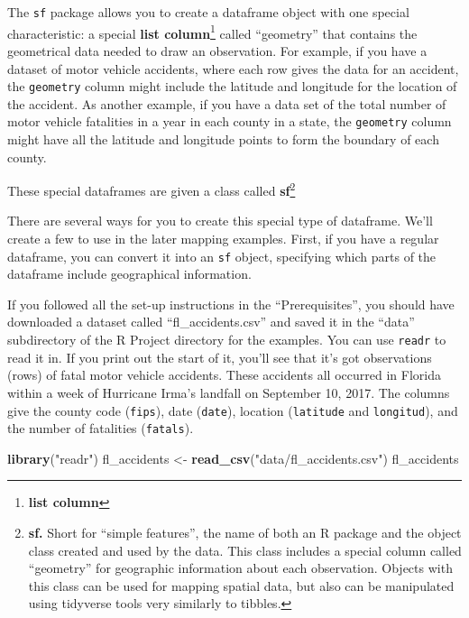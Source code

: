 \documentclass[]{tufte-book}
\newenvironment{Shaded}{}{}
\newcommand{\KeywordTok}[1]{\textcolor[rgb]{0.00,0.44,0.13}{\textbf{#1}}}
\newcommand{\NormalTok}[1]{#1}
\newcommand{\StringTok}[1]{\textcolor[rgb]{0.25,0.44,0.63}{#1}}
\begin{document}
The \texttt{sf} package allows you to create a dataframe object with one special characteristic: a
special \textbf{list column}\footnote{\textbf{list column}}
called ``geometry'' that contains the geometrical data needed to draw
an observation. For example, if you have a dataset of motor vehicle accidents, where each
row gives the data for an accident, the \texttt{geometry} column might include the latitude and
longitude for the location of the accident. As another example, if you have a data set of
the total number of motor vehicle fatalities in a year in each county in a state, the
\texttt{geometry} column might have all the latitude and longitude points to form the
boundary of each county.

These special dataframes are given a class called \textbf{sf}\footnote{\textbf{sf.} Short for ``simple features'',
  the name of both an R package and the object class created and used by the data. This class
  includes a special column called ``geometry'' for geographic information about each observation.
  Objects with this class can be used for mapping spatial data, but also can be manipulated
  using tidyverse tools very similarly to tibbles.}

There are several ways for you to create this special type of dataframe. We'll create a few
to use in the later mapping examples. First, if you have a regular dataframe, you can
convert it into an \texttt{sf} object, specifying which parts of the dataframe include geographical
information.

If you followed all the set-up instructions in the ``Prerequisites'', you should have downloaded a
dataset called ``fl\_accidents.csv'' and saved it in the ``data'' subdirectory of the R Project directory
for the examples. You can use \texttt{readr} to read it in. If you print out the start of it, you'll see
that it's got observations (rows) of fatal motor vehicle accidents. These accidents all occurred in
Florida within a week of Hurricane Irma's landfall on September 10, 2017. The columns give
the county code (\texttt{fips}), date (\texttt{date}), location (\texttt{latitude} and \texttt{longitud}), and the number of
fatalities (\texttt{fatals}).

\begin{Shaded}
\begin{Highlighting}[]
\KeywordTok{library}\NormalTok{(}\StringTok{"readr"}\NormalTok{)}
\NormalTok{fl_accidents <-}\StringTok{ }\KeywordTok{read_csv}\NormalTok{(}\StringTok{"data/fl_accidents.csv"}\NormalTok{)}
\NormalTok{fl_accidents}
\end{Highlighting}
\end{Shaded}
\end{document}
